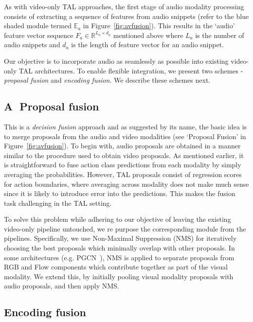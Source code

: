 \documentclass[10pt,twocolumn,letterpaper]{article}
\begin{document}
 As with video-only TAL approaches, the first stage of audio modality processing consists of extracting a sequence of features from audio snippets (refer to the blue shaded module termed $\mathbb{E}_a$ in Figure~\ref{fig:avfusion}). This results in the `audio' feature vector sequence $F_a \in \mathbb{R}^{L_{a} \times d_a}$ mentioned above where $L_a$ is the number of audio snippets and $d_a$ is the length of feature vector for an audio snippet. 
 
 Our objective is to incorporate audio as seamlessly as possible into existing video-only TAL architectures. To enable flexible integration, we present two schemes - \textit{proposal fusion} and \textit{encoding fusion}. We describe these schemes next.

\subsection{ \textcircled{A} Proposal fusion} 
\label{sec:propfusion}

This is a \textit{decision fusion} approach and as suggested by its name, the basic idea is to merge proposals from the audio and video modalities (see `Proposal Fusion' in Figure~\ref{fig:avfusion}). To begin with, audio proposals are obtained in a manner similar to the procedure used to obtain video proposals. As mentioned earlier, it is straightforward to fuse action class predictions from each modality by simply averaging the probabilities. However, TAL proposals consist of regression scores for action boundaries, where averaging across modality does not make much sense since it is likely to introduce error into the predictions. This makes the fusion task challenging in the TAL setting. 

To solve this problem while adhering to our objective of leaving the existing video-only pipeline untouched, we re purpose the corresponding module from the pipelines. Specifically, we use Non-Maximal Suppression (NMS) for iteratively choosing the best proposals which minimally overlap with other proposals. In some architectures (e.g. PGCN~\cite{PGCN2019ICCV}), NMS is applied to separate proposals from RGB and Flow components which contribute together as part of the visual modality. We extend this, by initially pooling visual modality proposals with audio proposals, and then apply NMS.

\subsection{ \raisebox{.5pt}{\textcircled{\raisebox{-1.01pt} {B}}} Encoding fusion}
\label{sec:encfusion}
\end{document}
